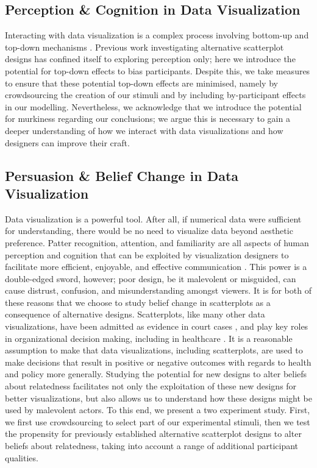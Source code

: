\documentclass[manuscript,screen,review]{acmart}
\begin{document}
\subsection{Perception \& Cognition in Data
Visualization}\label{perception-cognition-in-data-visualization}

Interacting with data visualization is a complex process involving
bottom-up and top-down mechanisms
\citep{shah_2011, franconeri_2021, xiong_2022}. Previous work
investigating alternative scatterplot designs has confined itself to
exploring perception only; here we introduce the potential for top-down
effects to bias participants. Despite this, we take measures to ensure
that these potential top-down effects are minimised, namely by
crowdsourcing the creation of our stimuli and by including
by-participant effects in our modelling. Nevertheless, we acknowledge
that we introduce the potential for murkiness regarding our conclusions;
we argue this is necessary to gain a deeper understanding of how we
interact with data visualizations and how designers can improve their
craft.

\subsection{Persuasion \& Belief Change in Data
Visualization}\label{persuasion-belief-change-in-data-visualization}

Data visualization is a powerful tool. After all, if numerical data were
sufficient for understanding, there would be no need to visualize data
beyond aesthetic preference. Patter recognition, attention, and
familiarity are all aspects of human perception and cognition that can
be exploited by visualization designers to facilitate more efficient,
enjoyable, and effective communication \citep{franconeri_2021}. This
power is a double-edged sword, however; poor design, be it malevolent or
misguided, can cause distrust, confusion, and misunderstanding amongst
viewers. It is for both of these reasons that we choose to study belief
change in scatterplots as a consequence of alternative designs.
Scatterplots, like many other data visualizations, have been admitted as
evidence in court cases \citep{bobko_1979}, and play key roles in
organizational decision making, including in healthcare
\citep{wang_2021}. It is a reasonable assumption to make that data
visualizations, including scatterplots, are used to make decisions that
result in positive or negative outcomes with regards to health and
policy more generally. Studying the potential for new designs to alter
beliefs about relatedness facilitates not only the exploitation of these
new designs for better visualizations, but also allows us to understand
how these designs might be used by malevolent actors. To this end, we
present a two experiment study. First, we first use crowdsourcing to
select part of our experimental stimuli, then we test the propensity for
previously established alternative scatterplot designs to alter beliefs
about relatedness, taking into account a range of additional participant
qualities.
\end{document}
